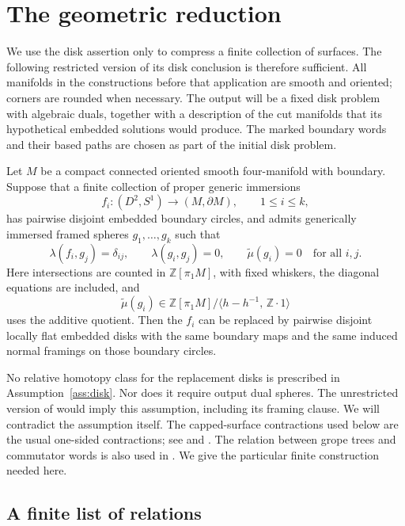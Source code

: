 \section{The geometric reduction}
\label{sec:geometry}

We use the disk assertion only to compress a finite collection of surfaces.
The following restricted version of its disk conclusion is therefore sufficient.
All manifolds in the constructions before that application are smooth and
oriented; corners are rounded when necessary.
The output will be a fixed disk problem with algebraic duals, together
with a description of the cut manifolds that its hypothetical embedded
solutions would produce. The marked boundary words and their based paths
are chosen as part of the initial disk problem.

\begin{assumption}
\label{ass:disk}
Let \(M\) be a compact connected oriented smooth four-manifold with boundary.
Suppose that a finite collection of proper generic immersions
\[
 f_i\colon(D^2,S^1)\longrightarrow(M,\partial M),\qquad 1\leq i\leq k,
\]
has pairwise disjoint embedded boundary circles, and admits generically immersed
framed spheres \(g_1,\ldots,g_k\) such that
\[
 \lambda(f_i,g_j)=\delta_{ij},\qquad
 \lambda(g_i,g_j)=0,\qquad
 \widetilde\mu(g_i)=0
 \quad\text{for all }i,j.
\]
Here intersections are counted in \(\mathbb Z[\pi_1M]\), with fixed whiskers,
the diagonal equations are included, and
\[
 \widetilde\mu(g_i)\in
 \mathbb Z[\pi_1M]\big/
 \big\langle h-h^{-1},\,\mathbb Z\cdot1\big\rangle
\]
uses the additive quotient. Then the \(f_i\) can be replaced by pairwise disjoint
locally flat embedded disks with the same boundary maps and the same induced
normal framings on those boundary circles.
\end{assumption}

No relative homotopy class for the replacement disks is prescribed in
Assumption~\ref{ass:disk}. Nor does it require output dual spheres. The
unrestricted version of \cite[Theorem~A]{PRT2025} would imply this assumption,
including its framing clause. We will contradict the assumption itself.
The capped-surface contractions used below are the usual one-sided
contractions; see \cite[\S1.2]{KQ2000} and
\cite[Lemma~3.4 and its preceding discussion]{PRT2025}.
The relation between grope trees and commutator words is also used in
\cite{FK2016,FK2020}. We give the particular finite construction needed here.

\subsection{A finite list of relations}

